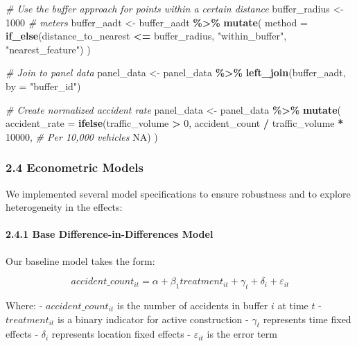\documentclass[
]{article}
\newenvironment{Shaded}{\begin{snugshade}}{\end{snugshade}}
\newcommand{\AttributeTok}[1]{\textcolor[rgb]{0.13,0.29,0.53}{#1}}
\newcommand{\CommentTok}[1]{\textcolor[rgb]{0.56,0.35,0.01}{\textit{#1}}}
\newcommand{\ConstantTok}[1]{\textcolor[rgb]{0.56,0.35,0.01}{#1}}
\newcommand{\DecValTok}[1]{\textcolor[rgb]{0.00,0.00,0.81}{#1}}
\newcommand{\FunctionTok}[1]{\textcolor[rgb]{0.13,0.29,0.53}{\textbf{#1}}}
\newcommand{\NormalTok}[1]{#1}
\newcommand{\OtherTok}[1]{\textcolor[rgb]{0.56,0.35,0.01}{#1}}
\newcommand{\SpecialCharTok}[1]{\textcolor[rgb]{0.81,0.36,0.00}{\textbf{#1}}}
\newcommand{\StringTok}[1]{\textcolor[rgb]{0.31,0.60,0.02}{#1}}
\begin{document}
\begin{Shaded}
\begin{Highlighting}[]
\CommentTok{\# Use the buffer approach for points within a certain distance}
\NormalTok{buffer\_radius }\OtherTok{\textless{}{-}} \DecValTok{1000}  \CommentTok{\# meters}
\NormalTok{buffer\_aadt }\OtherTok{\textless{}{-}}\NormalTok{ buffer\_aadt }\SpecialCharTok{\%\textgreater{}\%}
  \FunctionTok{mutate}\NormalTok{(}
    \AttributeTok{method =} \FunctionTok{if\_else}\NormalTok{(distance\_to\_nearest }\SpecialCharTok{\textless{}=}\NormalTok{ buffer\_radius, }\StringTok{"within\_buffer"}\NormalTok{, }\StringTok{"nearest\_feature"}\NormalTok{)}
\NormalTok{  )}

\CommentTok{\# Join to panel data}
\NormalTok{panel\_data }\OtherTok{\textless{}{-}}\NormalTok{ panel\_data }\SpecialCharTok{\%\textgreater{}\%}
  \FunctionTok{left\_join}\NormalTok{(buffer\_aadt, }\AttributeTok{by =} \StringTok{"buffer\_id"}\NormalTok{)}

\CommentTok{\# Create normalized accident rate}
\NormalTok{panel\_data }\OtherTok{\textless{}{-}}\NormalTok{ panel\_data }\SpecialCharTok{\%\textgreater{}\%}
  \FunctionTok{mutate}\NormalTok{(}
    \AttributeTok{accident\_rate =} \FunctionTok{ifelse}\NormalTok{(traffic\_volume }\SpecialCharTok{\textgreater{}} \DecValTok{0}\NormalTok{, }
\NormalTok{                          accident\_count }\SpecialCharTok{/}\NormalTok{ traffic\_volume }\SpecialCharTok{*} \DecValTok{10000}\NormalTok{,  }\CommentTok{\# Per 10,000 vehicles}
                          \ConstantTok{NA}\NormalTok{)}
\NormalTok{  )}
\end{Highlighting}
\end{Shaded}

\subsubsection{2.4 Econometric Models}\label{econometric-models}

We implemented several model specifications to ensure robustness and to
explore heterogeneity in the effects:

\paragraph{2.4.1 Base Difference-in-Differences
Model}\label{base-difference-in-differences-model}

Our baseline model takes the form:

\[accident\_count_{it} = \alpha + \beta_1 treatment_{it} + \gamma_t + \delta_i + \varepsilon_{it}\]

Where: - \(accident\_count_{it}\) is the number of accidents in buffer
\(i\) at time \(t\) - \(treatment_{it}\) is a binary indicator for
active construction - \(\gamma_t\) represents time fixed effects -
\(\delta_i\) represents location fixed effects - \(\varepsilon_{it}\) is
the error term
\end{document}
